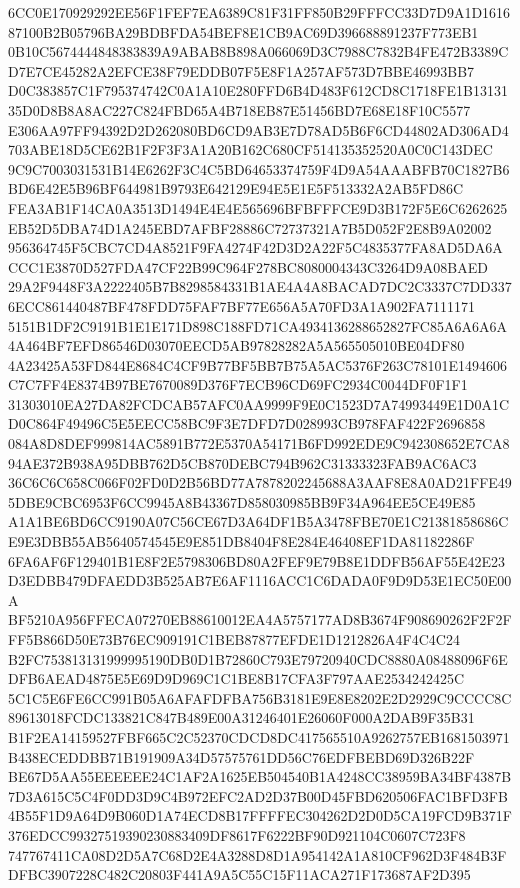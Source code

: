 \documentclass[UTF8,fontset=fandol,zihao=-4,a4paper]{ctexart}
\begin{document}
{{6CC0E170929292EE56F1FEF7EA6389C81F31FF850B29FFFCC33D7D9A1D161687100B2B05796BA29BDBFDA54BEF8E1CB9AC69D396688891237F773EB1
0B10C5674444848383839A9ABAB8B898A066069D3C7988C7832B4FE472B3389CD7E7CE45282A2EFCE38F79EDDB07F5E8F1A257AF573D7BBE46993BB7
D0C383857C1F795374742C0A1A10E280FFD6B4D483F612CD8C1718FE1B1313135D0D8B8A8AC227C824FBD65A4B718EB87E51456BD7E68E18F10C5577
E306AA97FF94392D2D262080BD6CD9AB3E7D78AD5B6F6CD44802AD306AD4703ABE18D5CE62B1F2F3F3A1A20B162C680CF514135352520A0C0C143DEC
9C9C7003031531B14E6262F3C4C5BD64653374759F4D9A54AAABFB70C1827B6BD6E42E5B96BF644981B9793E642129E94E5E1E5F513332A2AB5FD86C
FEA3AB1F14CA0A3513D1494E4E4E565696BFBFFFCE9D3B172F5E6C6262625EB52D5DBA74D1A245EBD7AFBF28886C72737321A7B5D052F2E8B9A02002
956364745F5CBC7CD4A8521F9FA4274F42D3D2A22F5C4835377FA8AD5DA6ACCC1E3870D527FDA47CF22B99C964F278BC8080004343C3264D9A08BAED
29A2F9448F3A2222405B7B8298584331B1AE4A4A8BACAD7DC2C3337C7DD3376ECC861440487BF478FDD75FAF7BF77E656A5A70FD3A1A902FA7111171
5151B1DF2C9191B1E1E171D898C188FD71CA4934136288652827FC85A6A6A6A4A464BF7EFD86546D03070EECD5AB97828282A5A565505010BE04DF80
4A23425A53FD844E8684C4CF9B77BF5BB7B75A5AC5376F263C78101E1494606C7C7FF4E8374B97BE7670089D376F7ECB96CD69FC2934C0044DF0F1F1
31303010EA27DA82FCDCAB57AFC0AA9999F9E0C1523D7A74993449E1D0A1CD0C864F49496C5E5EECC58BC9F3E7DFD7D028993CB978FAF422F2696858
084A8D8DEF999814AC5891B772E5370A54171B6FD992EDE9C942308652E7CA894AE372B938A95DBB762D5CB870DEBC794B962C31333323FAB9AC6AC3
36C6C6C658C066F02FD0D2B56BD77A7878202245688A3AAF8E8A0AD21FFE495DBE9CBC6953F6CC9945A8B43367D858030985BB9F34A964EE5CE49E85
A1A1BE6BD6CC9190A07C56CE67D3A64DF1B5A3478FBE70E1C21381858686CE9E3DBB55AB5640574545E9E851DB8404F8E284E46408EF1DA81182286F
6FA6AF6F129401B1E8F2E5798306BD80A2FEF9E79B8E1DDFB56AF55E42E23D3EDBB479DFAEDD3B525AB7E6AF1116ACC1C6DADA0F9D9D53E1EC50E00A
BF5210A956FFECA07270EB88610012EA4A5757177AD8B3674F908690262F2F2FFF5B866D50E73B76EC909191C1BEB87877EFDE1D1212826A4F4C4C24
B2FC753813131999995190DB0D1B72860C793E79720940CDC8880A08488096F6EDFB6AEAD4875E5E69D9D969C1C1BE8B17CFA3F797AAE2534242425C
5C1C5E6FE6CC991B05A6AFAFDFBA756B3181E9E8E8202E2D2929C9CCCC8C89613018FCDC133821C847B489E00A31246401E26060F000A2DAB9F35B31
B1F2EA14159527FBF665C2C52370CDCD8DC417565510A9262757EB1681503971B438ECEDDBB71B191909A34D57575761DD56C76EDFBEBD69D326B22F
BE67D5AA55EEEEEE24C1AF2A1625EB504540B1A4248CC38959BA34BF4387B7D3A615C5C4F0DD3D9C4B972EFC2AD2D37B00D45FBD620506FAC1BFD3FB
4B55F1D9A64D9B060D1A74ECD8B17FFFFEC304262D2D0D5CA19FCD9B371F376EDCC99327519390230883409DF8617F6222BF90D921104C0607C723F8
747767411CA08D2D5A7C68D2E4A3288D8D1A954142A1A810CF962D3F484B3FDFBC3907228C482C20803F441A9A5C55C15F11ACA271F173687AF2D395
}}
\end{document}
